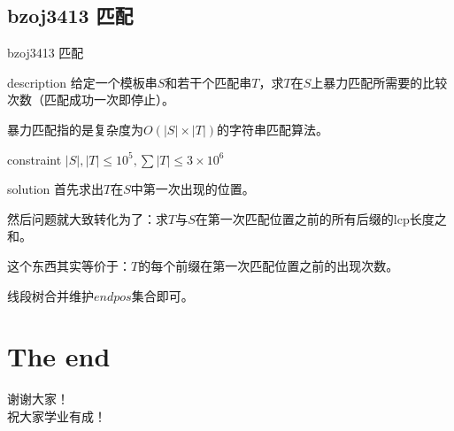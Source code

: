 \documentclass{beamer}
\begin{document}
\subsection{bzoj3413 匹配}
\begin{frame}{bzoj3413 匹配}
	\begin{block}{description}
	给定一个模板串$S$和若干个匹配串$T$，求$T$在$S$上暴力匹配所需要的比较次数（匹配成功一次即停止）。
	
	暴力匹配指的是复杂度为$O(|S|\times|T|)$的字符串匹配算法。	
	\end{block}
	\begin{block}{constraint}
	$|S|,|T|\le 10^5, \sum |T|\le 3\times 10^6$
	\end{block}
\pause
\begin{block}{solution}
	首先求出$T$在$S$中第一次出现的位置。
	
	然后问题就大致转化为了：求$T$与$S$在第一次匹配位置之前的所有后缀的lcp长度之和。\pause
	
	这个东西其实等价于：$T$的每个前缀在第一次匹配位置之前的出现次数。
	
	线段树合并维护$endpos$集合即可。
\end{block}
\end{frame}

\section{The end}
\begin{frame}
	\begin{center}
		{\huge 谢谢大家！\\  \large 祝大家学业有成！}
	\end{center}
\end{frame}
\end{document}
